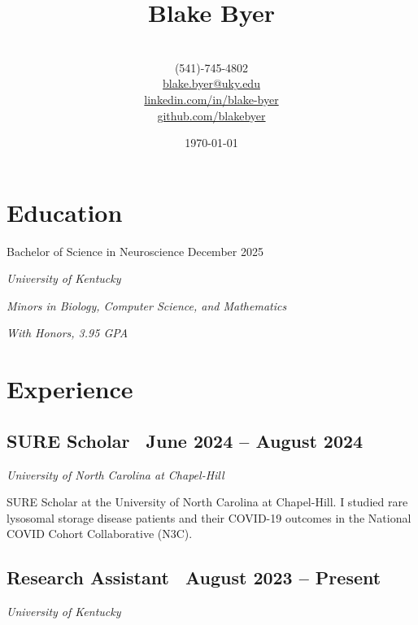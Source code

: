 \documentclass{article}
\begin{document}
\title{\Huge \textbf{Blake Byer} \vspace{-1.25em}}

\author{\\
    (541)-745-4802 \\
    \href{mailto:blake.byer@uky.edu}{blake.byer@uky.edu} \\
    \href{https://linkedin.com/in/blake-byer}{linkedin.com/in/blake-byer} \\
    \href{https://github.com/blakebyer}{github.com/blakebyer}
}
\date{\today}
\maketitle

\begin{flushleft}

\section*{Education}

{\large Bachelor of Science in Neuroscience \vspace{0.5em}}\hfill December 2025

\textit{University of Kentucky}

\textit{Minors in Biology, Computer Science, and Mathematics}

\textit{With Honors, 3.95 GPA}

\section*{Experience}

\subsection*{SURE Scholar {\hfill\normalsize\normalfont\ June 2024 -- August 2024}}
\textit{University of North Carolina at Chapel-Hill \vspace{0.5em}}

SURE Scholar at the University of North Carolina at Chapel-Hill. I studied rare lysosomal storage disease patients
and their COVID-19 outcomes in the National COVID Cohort Collaborative (N3C).

\subsection*{Research Assistant {\hfill\normalsize\normalfont\ August 2023 -- Present}}
\textit{University of Kentucky \vspace{0.5em}}


\end{flushleft}
\end{document}
